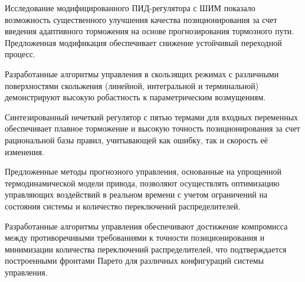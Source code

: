 Исследование модифицированного ПИД-регулятора с ШИМ показало возможность существенного улучшения качества позиционирования за счет
введения адаптивного торможения на основе прогнозирования тормозного пути. Предложенная модификация обеспечивает снижение устойчивый переходной процесс.

Разработанные алгоритмы управления в скользящих режимах с различными поверхностями скольжения (линейной, интегральной и терминальной) демонстрируют
высокую робастность к параметрическим возмущениям.

Синтезированный нечеткий регулятор с пятью термами для входных переменных обеспечивает плавное торможение и высокую точность позиционирования за счет
рациональной базы правил, учитывающей как ошибку, так и скорость её изменения.

Предложенные методы прогнозного управления, основанные на упрощенной термодинамической модели привода, позволяют осуществлять
оптимизацию управляющих воздействий в реальном времени с учетом ограничений на состояния системы и количество переключений распределителей.

Разработанные алгоритмы управления обеспечивают достижение компромисса между противоречивыми требованиями к точности позиционирования и 
минимизации количества переключений распределителей, что подтверждается построенными фронтами Парето для различных конфигураций системы управления.




